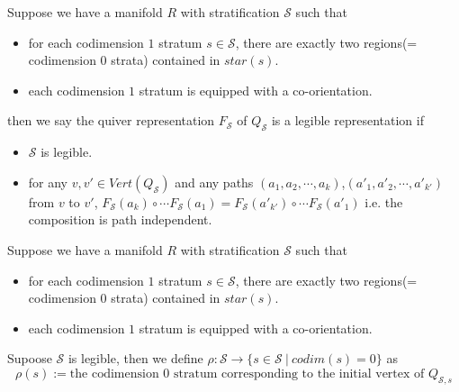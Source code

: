 \begin{definition}
Suppose we have a manifold $R$ with stratification $\mathcal{S}$ such that
\begin{itemize}
\item for each codimension $1$ stratum $s\in \mathcal{S}$, there are exactly two regions(= codimension $0$ strata) contained in $star(s)$.

\item each codimension $1$ stratum is equipped with a co-orientation.
\end{itemize}
then we say the quiver representation $F_{\mathcal{S}}$ of $Q_{\mathcal{S}}$ is a legible representation if
\begin{itemize}
\item $\mathcal{S}$ is legible.

\item for any $v,v' \in Vert(Q_{\mathcal{S}})$ and any paths $(a_1,a_2,\cdots,a_k)$,$(a'_1,a'_2,\cdots,a'_{k'})$ from $v$ to $v'$, $F_{\mathcal{S}}(a_k)\circ \cdots F_{\mathcal{S}}(a_1) = F_{\mathcal{S}}(a'_{k'})\circ \cdots F_{\mathcal{S}}(a'_1) $ i.e. the composition is path independent.
\end{itemize}
\end{definition}

\begin{definition}
Suppose we have a manifold $R$ with stratification $\mathcal{S}$ such that
\begin{itemize}
\item for each codimension $1$ stratum $s\in \mathcal{S}$, there are exactly two regions(= codimension $0$ strata) contained in $star(s)$.

\item each codimension $1$ stratum is equipped with a co-orientation.
\end{itemize}
Supoose $\mathcal{S}$ is legible, then we define $\rho:\mathcal{S}\rightarrow \{s\in \mathcal{S} ~|~ codim(s)=0 \}$ as
\[
\rho(s):=\text{the codimension $0$ stratum corresponding to the initial vertex of $Q_{\mathcal{S},s}$}
\]
\end{definition}


